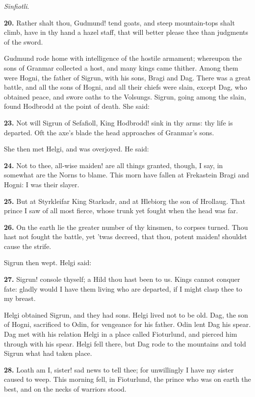 \emph{Sinfiotli}.

\textbf{20.} Rather shalt thou, Gudmund! tend goats, and steep mountain-tops
shalt climb, have in thy hand a hazel staff, that will better please
thee than judgments of the sword.

Gudmund rode home with intelligence of the hostile armament; whereupon
the sons of Granmar collected a host, and many kings came thither.
Among them were Hogni, the father of Sigrun, with his sons, Bragi and
Dag. There was a great battle, and all the sons of Hogni, and all
their chiefs were slain, except Dag, who obtained peace, and swore
oaths to the Volsungs. Sigrun, going among the slain, found Hodbrodd
at the point of death. She said:

\textbf{23.} Not will Sigrun of Sefafioll, King Hodbrodd! sink in thy arms:
thy life is departed. Oft the axe's blade the head approaches of
Granmar's sons.

She then met Helgi, and was overjoyed. He said:

\textbf{24.} Not to thee, all-wise maiden! are all things granted, though, I
say, in somewhat are the Norns to blame. This morn have fallen at
Frekastein Bragi and Hogni: I was their slayer.

\textbf{25.} But at Styrkleifar King Starkadr, and at Hlebiorg the son of
Hrollaug. That prince I saw of all most fierce, whose trunk yet fought
when the head was far.

\textbf{26.} On the earth lie the greater number of thy kinsmen, to corpses
turned. Thou hast not fought the battle, yet 'twas decreed, that thou,
potent maiden! shouldst cause the strife.

Sigrun then wept. Helgi said:

\textbf{27.} Sigrun! console thyself; a Hild thou hast been to us. Kings
cannot conquer fate: gladly would I have them living who are departed,
if I might clasp thee to my breast.

Helgi obtained Sigrun, and they had sons. Helgi lived not to be old.
Dag, the son of Hogni, sacrificed to Odin, for vengeance for his
father. Odin lent Dag his spear. Dag met with his relation Helgi in a
place called Fioturlund, and pierced him through with his spear. Helgi
fell there, but Dag rode to the mountains and told Sigrun what had
taken place.

\textbf{28.} Loath am I, sister! sad news to tell thee; for unwillingly I
have my sister caused to weep. This morning fell, in Fioturlund, the
prince who was on earth the best, and on the necks of warriors stood.

